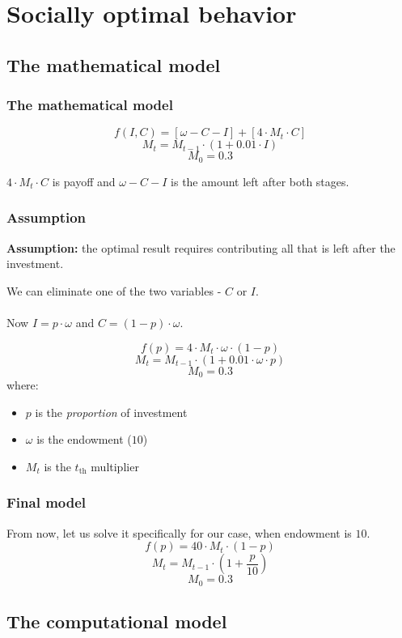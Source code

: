 \section{Socially optimal behavior}

	\subsection{The mathematical model}

		\begin{frame}
			\frametitle{The mathematical model} 
			\[
				f(I, C) = [\omega - C - I] + [4 \cdot M_t \cdot C]
			\]
			\[
				M_t = M_{t-1} \cdot (1 + 0.01 \cdot I)
			\]
			\[
				M_0 = 0.3
			\]

			$4 \cdot M_t \cdot C$ is payoff and $\omega - C - I$ is the amount left after both stages.
		\end{frame}

		\begin{frame}
			\frametitle{Assumption}
			
			\textbf{Assumption:} the optimal result requires contributing all that is left after the investment.
			
			We can eliminate one of the two variables - $C$ or $I$. \\~\\
			
			Now $I = p \cdot \omega$ and $C = (1-p) \cdot \omega$.
			
			\[
				f(p) = 4 \cdot M_t \cdot \omega \cdot (1 - p)
			\]
			\[
				M_t = M_{t-1} \cdot (1 + 0.01 \cdot \omega \cdot p)
			\]
			\[
				M_0 = 0.3
			\]
			where:
			\begin{itemize}
				\item
					$p$ is the \emph{proportion} of investment
				\item 
					$\omega$ is the endowment ($10$)
				\item
					$M_t$ is the $t_\text{th}$ multiplier
			\end{itemize}
		\end{frame}

		\begin{frame}
			\frametitle{Final model}
			From now, let us solve it specifically for our case, when endowment is $10$.
			\[
				f(p) = 40 \cdot M_t \cdot (1 - p)
			\]
			\[
				M_t = M_{t-1} \cdot \left(1 + \frac{p}{10} \right)
			\]
			\[
				M_0 = 0.3
			\]
		\end{frame}

	\subsection{The computational model}


